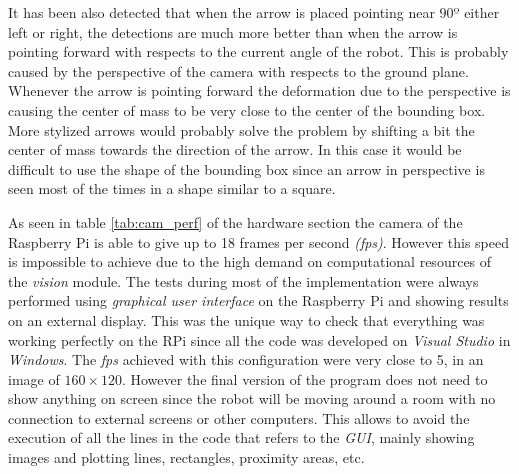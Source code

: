 It has been also detected that when the arrow is placed pointing near $90º$ either left or right, the detections are much more better than when the arrow is pointing forward with respects to the current angle of the robot. This is probably caused by the perspective of the camera with respects to the ground plane. Whenever the arrow is pointing forward the deformation due to the perspective is causing the center of mass to be very close to the center of the bounding box. More stylized arrows would probably solve the problem by shifting a bit the center of mass towards the direction of the arrow. In this case it would be difficult to use the shape of the bounding box since an arrow in perspective is seen most of the times in a shape similar to a square.

As seen in table \ref{tab:cam_perf} of the hardware section the camera of the Raspberry Pi is able to give up to 18 frames per second \textit{(fps)}. However this speed is impossible to achieve due to the high demand on computational resources of the \textit{vision} module. The tests during most of the implementation were always performed using \textit{graphical user interface} on the Raspberry Pi and showing results on an external display. This was the unique way to check that everything was working perfectly on the RPi since all the code was developed on \textit{Visual Studio} in \textit{Windows}. The \textit{fps} achieved with this configuration were very close to 5, in an image of $160\times120$. However the final version of the program does not need to show anything on screen since the robot will be moving around a room with no connection to external screens or other computers. This allows to avoid the execution of all the lines in the code that refers to the \textit{GUI}, mainly showing images and plotting lines, rectangles, proximity areas, etc. 

